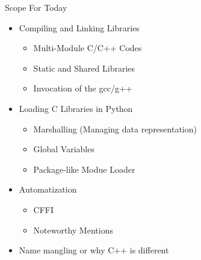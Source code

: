 \begin{frame}{Scope For Today}
%
\begin{itemize}
\item Compiling and Linking Libraries
	\begin{itemize}
	\item Multi-Module C/C++ Codes
	\item Static and Shared Libraries
	\item Invocation of the gcc/g++
	\end{itemize}
\item Loading C Libraries in Python
	\begin{itemize}
	\item Marshalling (Managing data representation)
	\item Global Variables
	\item Package-like Modue Loader
	\end{itemize}
\item Automatization
	\begin{itemize}
	\item CFFI
	\item Noteworthy Mentions
	\end{itemize}
\item Name mangling or why C++ is different
\end{itemize}
%
\end{frame}


